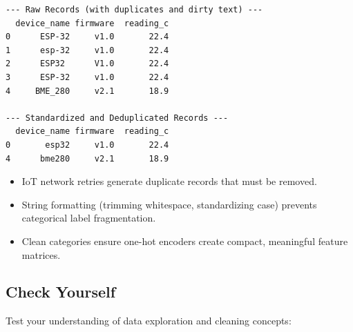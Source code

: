 \begin{lstlisting}[style=outputstyle]
--- Raw Records (with duplicates and dirty text) ---
  device_name firmware  reading_c
0      ESP-32     v1.0       22.4
1      esp-32     v1.0       22.4
2      ESP32      V1.0       22.4
3      ESP-32     v1.0       22.4
4     BME_280     v2.1       18.9

--- Standardized and Deduplicated Records ---
  device_name firmware  reading_c
0       esp32     v1.0       22.4
4      bme280     v2.1       18.9
\end{lstlisting}

\begin{takeaways}
\begin{itemize}
    \item IoT network retries generate duplicate records that must be removed.
    \item String formatting (trimming whitespace, standardizing case) prevents categorical label fragmentation.
    \item Clean categories ensure one-hot encoders create compact, meaningful feature matrices.
\end{itemize}
\end{takeaways}

\subsection{Check Yourself}

Test your understanding of data exploration and cleaning concepts:

